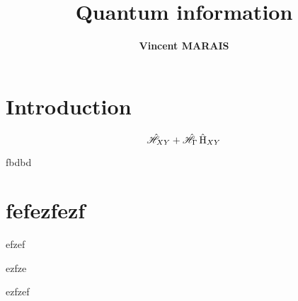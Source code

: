 \documentclass[12pt,a4paper]{article}
\title{Quantum information}
\author{\textbf{Vincent MARAIS}}
\begin{document}
	

\newpage





\newpage
\pagestyle{arabicstyle}
\section{Introduction}
\lipsum[2-4] %

\begin{equation}
	\hat{\mathscr{H}}_{XY} + 	\hat{\mathscr{H}}_{\Gamma} 
	\operatorname{{\hat{H}}}_{XY}
\end{equation}

\newpage
	
fbdbd
\section{fefezfezf}

efzef
\newpage 

ezfze
\newpage 

ezfzef
\end{document}
